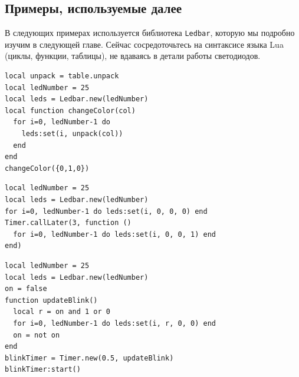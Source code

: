 \subsection{Примеры, используемые далее}
\begin{infobox}
    В следующих примерах используется библиотека \texttt{Ledbar}, которую мы подробно изучим в следующей главе. Сейчас сосредоточьтесь на синтаксисе языка Lua (циклы, функции, таблицы), не вдаваясь в детали работы светодиодов.
\end{infobox}
\begin{verbatim}
local unpack = table.unpack
local ledNumber = 25
local leds = Ledbar.new(ledNumber)
local function changeColor(col)
  for i=0, ledNumber-1 do
    leds:set(i, unpack(col))
  end
end
changeColor({0,1,0})
\end{verbatim}
\begin{verbatim}
local ledNumber = 25
local leds = Ledbar.new(ledNumber)
for i=0, ledNumber-1 do leds:set(i, 0, 0, 0) end
Timer.callLater(3, function ()
  for i=0, ledNumber-1 do leds:set(i, 0, 0, 1) end
end)
\end{verbatim}
\begin{verbatim}
local ledNumber = 25
local leds = Ledbar.new(ledNumber)
on = false
function updateBlink()
  local r = on and 1 or 0
  for i=0, ledNumber-1 do leds:set(i, r, 0, 0) end
  on = not on
end
blinkTimer = Timer.new(0.5, updateBlink)
blinkTimer:start()
\end{verbatim}
